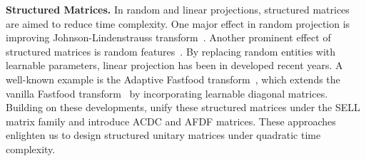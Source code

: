 \noindent\textbf{Structured Matrices.}
In random and linear projections, structured matrices are aimed to reduce time complexity. One major effect in random projection is improving Johnson-Lindenstrauss transform~\citep{10.1145/1132516.1132597,10.1145/1806689.1806737}. Another prominent effect of structured matrices is random features~\citep{pmlr-v28-le13,NIPS2016_53adaf49}. By replacing random entities with learnable parameters, linear projection has been in developed recent years. A well-known example is the Adaptive Fastfood transform~\citep{Yang_2015_ICCV}, which extends the vanilla Fastfood transform~\citep{pmlr-v28-le13} by incorporating learnable diagonal matrices. Building on these developments, \citet{moczulski2016acdc} unify these structured matrices under the SELL matrix family and introduce ACDC and AFDF matrices. These approaches enlighten us to design structured unitary matrices under quadratic time complexity.